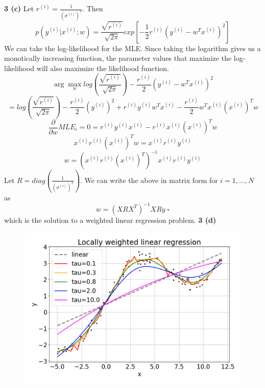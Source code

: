 \documentclass[12 pt]{article}        	%
\begin{document}
\textbf{3 (c)} Let $ r^{(i)} = \frac{1}{(\sigma^{(i)})^2} $. Then
\begin{displaymath}
  p(y^{(i)} | x^{(i)}; w) = \frac{\sqrt{r^{(i)}}}{\sqrt{2\pi}} exp[ -\frac{1}{2}r^{(i)} (y^{(i)} - w^T x^{(i)})^2 ]
\end{displaymath}
We can take the log-likelihood for the MLE. 
Since taking the logarithm gives us a monotically increasing function, the parameter values that maximize the log-likelihood 
will also maximize the likelihood function.
\begin{displaymath}
  \arg \max_{w} log(\frac{\sqrt{r^{(i)}}}{\sqrt{2 \pi}}) - \frac{r^{(i)}}{2} (y^{(i)} - w^T x^{(i)})^2
\end{displaymath}
\begin{displaymath}
  = log(\frac{\sqrt{r^{(i)}}}{\sqrt{2 \pi}}) 
  - \frac{r^{(i)}}{2} (y^{(i)})^2
  + r^{(i)} y^{(i)} w^T x^{(i)}
  - \frac{r^{(i)}}{2} w^T x^{(i)} (x^{(i)})^T w
\end{displaymath}
\begin{displaymath}
  \frac{\partial}{\partial w} MLE_i = 0 = 
  r^{(i)} y^{(i)} x^{(i)}
  - r^{(i)} x^{(i)} (x^{(i)})^T w
\end{displaymath}
\begin{displaymath} 
  x^{(i)} r^{(i)} (x^{(i)})^T w =
  x^{(i)} r^{(i)} y^{(i)} 
\end{displaymath}
\begin{displaymath} 
  w = (x^{(i)} r^{(i)} (x^{(i)})^T)^{-1} x^{(i)} r^{(i)} y^{(i)} 
\end{displaymath}
Let $ R = diag(\frac{1}{(\sigma^{(i)})^2}) $. 
We can write the above in matrix form for $ i = 1, ..., N $ as 
\begin{displaymath}
  w = (X R X^T)^{-1} XRy \; \square
\end{displaymath}
which is the solution to a weighted linear regression problem.
\newpage \textbf{3 (d)}
\begin{figure}[h!]
  \includegraphics[width=\linewidth]{locally_weighted_lr.png}
\end{figure} \\
\end{document}
